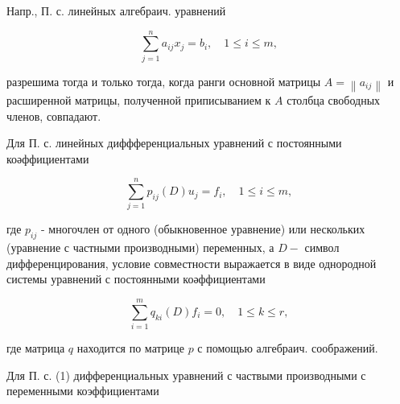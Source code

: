 \documentclass[10pt]{article}
\begin{document}
Напр., П. с. линейных алгебраич. уравнений

\[
\sum_{j=1}^{n} a_{i j} x_{j}=b_{i}, \quad 1 \leqslant i \leqslant m,
\]

разрешима тогда и только тогда, когда ранги основной матрицы $A=\left\|a_{i j}\right\|$ и расширенной матрицы, полученной приписыванием к $A$ столбца свободных членов, совпадают.

Для П. с. линейных диффференциальных уравнений с постоянными коәффициентами

\[
\sum_{j=1}^{n} p_{i j}(D) u_{j}=f_{i}, \quad 1 \leqslant i \leqslant m,
\]

где $p_{i j}$ - многочлен от одного (обыкновенное уравнение) или нескольких (уравнение с частными производными) переменных, а $D-$ символ дифференцирования, условие совместности выражается в виде однородной системы уравнений с постоянными коәффициентами

\[
\sum_{i=1}^{m} q_{k i}(D) f_{i}=0, \quad 1 \leqslant k \leqslant r,
\]

где матрица $q$ находится по матрице $p$ с помощью алгебраич. соображений.

Для П. с. (1) дифференциальных уравнений с частвыми производными с переменными коэффициентами
\end{document}
